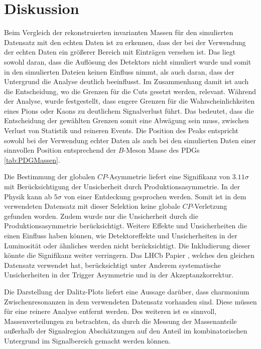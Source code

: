 \section{Diskussion}
\label{sec:discussion}

Beim Vergleich der rekonstruierten invarianten Massen für den simulierten Datensatz
mit den echten Daten ist zu erkennen, dass der bei der Verwendung der echten Daten
ein größerer Bereich mit Einträgen versehen ist. Das liegt sowohl daran, dass die Auflösung des Detektors
nicht simuliert wurde und somit in den simulierten Dateien keinen Einfluss nimmt, als auch daran, dass der Untergrund
die Analyse deutlich beeinflusst. Im Zusammenhang damit ist auch die Entscheidung, wo
die Grenzen für die Cuts gesetzt werden, relevant. Während der Analyse, wurde
festgestellt, dass engere Grenzen für die Wahrscheinlichkeiten eines Pions oder
Kaons zu deutlichem Signalverlust führt. Das bedeutet, dass die Entscheidung der
gewählten Grenzen somit eine Abwägung sein muss, zwischen Verlust von Statistik
und reineren Events. Die Position des Peaks entspricht sowohl bei der Verwendung
echter Daten als auch bei den simulierten Daten einer sinnvollen Position entsprechend
der $B$-Meson Masse des PDGs \ref{tab:PDGMassen}. \par

Die Bestimmung der globalen $CP$-Asymmetrie liefert eine Signifikanz von
$3.11\sigma$ mit Berücksichtigung der Unsicherheit durch
Produktionsasymmetrie. In der Physik kann ab $5\sigma$ von einer Entdeckung
gesprochen werden. Somit ist in dem verwendeten Datensatz mit dieser
Selektion keine globale $CP$-Verletzung gefunden worden. Zudem wurde nur die
Unsicherheit durch die Produktionsasymmetrie berücksichtigt. Weitere Effekte
und Unsicherheiten die einen Einfluss haben können, wie Detektoreffekte und
Unsicherheiten in der Luminosität oder ähnliches werden nicht berücksichtigt.
Die Inkludierung dieser könnte die Signifikanz weiter verringern. Das LHCb
Papier \cite{paper}, welches den gleichen Datensatz verwendet hat, berücksichtigt
unter Anderem systematische Unsicherheiten in der Trigger Asymmetrie und
in der Akzeptanzkorrektur. \par

Die Darstellung der Dalitz-Plots liefert eine Aussage darüber, dass charmonium
Zwischenresonanzen in dem verwendeten Datensatz vorhanden sind. Diese müssen
für eine reinere Analyse entfernt werden. Des weiteren ist es sinnvoll,
Massenverteilungen zu betrachten, da durch die Messung der Massenanteile
außerhalb der Signalregion Abschätzungen auf den Anteil im kombinatorischen
Untergrund im Signalbereich gemacht werden können.\par

